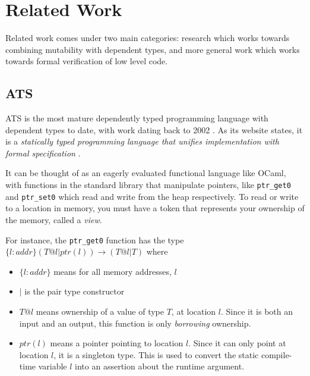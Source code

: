 \documentclass[12pt,twoside]{report}
\begin{document}

\section{Related Work}
\label{section:relatedwork}
Related work comes under two main categories: research which works towards combining mutability with dependent types, and more general work which works towards formal verification of low level code.


\subsection{ATS}
ATS \citep{xiAppliedTypeSystem2017} is the most mature dependently typed programming language with dependent types to date, with work dating back to 2002 \citep{ATSImplements}. As its website states, it is a \textit{statically typed programming language that unifies implementation with formal specification} \citep{ATSHome}.

It can be thought of as an eagerly evaluated functional language like OCaml, with functions in the standard library that manipulate pointers, like \verb|ptr_get0| and \verb|ptr_set0| which read and write from the heap respectively. To read or write to a location in memory, you must have a token that represents your ownership of the memory, called a \textit{view}.

For instance, the \verb|ptr_get0| function has the type $\{l:addr\} (T @ l | ptr (l)) \rightarrow (T @ l | T)$ where
\begin{itemize}
  \item $\{l:addr\}$ means for all memory addresses, $l$
  \item $|$ is the pair type constructor
  \item $T @ l$ means ownership of a value of type $T$, at location $l$. Since it is both an input and an output, this function is only \textit{borrowing} ownership.
  \item $ptr(l)$ means a pointer pointing to location $l$. Since it can only point at location $l$, it is a singleton type. This is used to convert the static compile-time variable $l$ into an assertion about the runtime argument.
\end{itemize}
\end{document}

